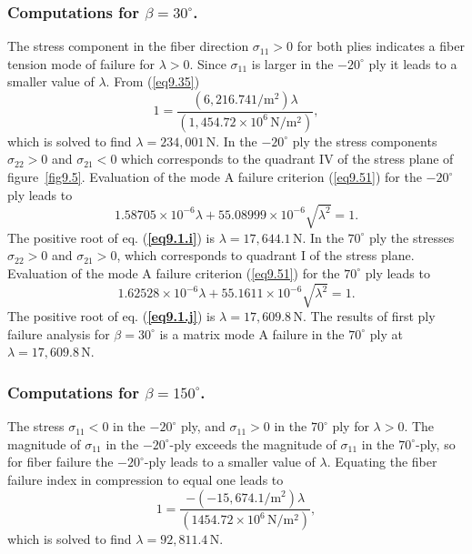 \documentclass{AeroStructure-ERJohnson}
\begin{document}
\begin{example}
\subsubsection{Computations for $\beta=30^{\circ}$.}\quad The stress component in the fiber direction $\sigma_{11}>0$ for both plies indicates a fiber tension mode of failure for $\lambda>0$. Since $\sigma_{11}$ is larger in the $-20^{\circ}$ ply it leads to a smaller value of  $\lambda$. From (\ref{eq9.35})
\begin{equation}
1=\frac{\left(6{,}216.741/\mathrm{m}^{2}\right) \lambda}{\left(1{,}454.72 \times 10^{6}\,\mathrm{N}/\mathrm{m}^{2}\right)}, \label{eq9.1.h}\tag{h}
\end{equation}
which is solved to find $\lambda=234{,}001\,\mathrm{N}$. In the $-20^{\circ}$ ply the stress components $\sigma_{22}>0$ and $\sigma_{21}<0$ which corresponds to the quadrant IV of the stress plane of figure~\ref{fig9.5}. Evaluation of the mode A failure criterion (\ref{eq9.51}) for the $-20^{\circ}$ ply leads to
\begin{equation}
1.58705 \times 10^{-6} \lambda+55.08999 \times 10^{-6} \sqrt{\lambda^{2}}=1. \label{eq9.1.i}\tag{i}
\end{equation}
The positive root of eq. (\textbf{\ref{eq9.1.i}}) is $\lambda=17{,}644.1\,\mathrm{N}$. In the $70^{\circ}$ ply the stresses $\sigma_{22}>0$ and $\sigma_{21}>0$, which corresponds to quadrant I of the stress plane. Evaluation of the mode A failure criterion (\ref{eq9.51}) for the $70^{\circ}$ ply leads to
\begin{equation}
1.62528 \times 10^{-6} \lambda+55.1611 \times 10^{-6} \sqrt{\lambda^{2}}=1. \label{eq9.1.j}\tag{j}
\end{equation}
The positive root of eq. (\textbf{\ref{eq9.1.j}}) is $\lambda=17{,}609.8\,\mathrm{N}$. The results of first ply failure analysis for $\beta=30^{\circ}$ is a matrix mode A failure in the $70^{\circ}$ ply at $\lambda=17{,}609.8\,\mathrm{N}$.

\subsubsection{Computations for $\beta=150^{\circ}$.}\quad The stress $\sigma_{11}<0$ in the $-20^{\circ}$ ply, and $\sigma_{11}>0$ in the $70^{\circ}$ ply for $\lambda>0$. The magnitude of $\sigma_{11}$ in the $-20^{\circ}$-ply exceeds the magnitude of $\sigma_{11}$ in the $70^{\circ}$-ply, so for fiber failure the $-20^{\circ}$-ply leads\vadjust{\vspace*{8pt}\pagebreak} to a smaller value of $\lambda$. Equating the fiber failure index in compression to equal one leads to
\begin{equation}
1=\frac{-\left(-15{,}674.1/\mathrm{m}^{2}\right) \lambda}{\left(1454.72 \times 10^{6}\,\mathrm{N}/\mathrm{m}^{2}\right)}, \label{eq9.1.k}\tag{k}
\end{equation}
which is solved to find $\lambda=92{,}811.4\,\mathrm{N}$.


\end{example}
\end{document}
